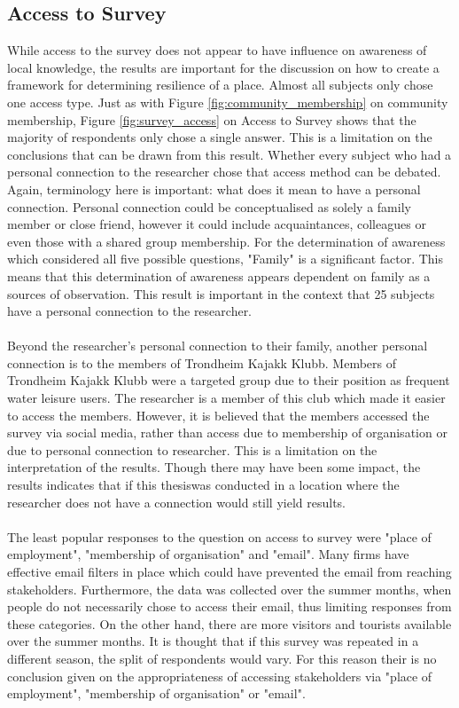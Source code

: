 \subsection{Access to Survey}
While access to the survey does not appear to have influence on awareness of local knowledge, the results are important for the discussion on how to create a framework for determining resilience of a place. Almost all subjects only chose one access type. Just as with Figure \ref{fig:community_membership} on community membership, Figure \ref{fig:survey_access} on Access to Survey shows that the majority of respondents only chose a single answer. This is a limitation on the conclusions that can be drawn from this result. Whether every subject who had a personal connection to the researcher chose that access method can be debated. Again, terminology here is important: what does it mean to have a personal connection. Personal connection could be conceptualised as solely a family member or close friend, however it could include acquaintances, colleagues or even those with a shared group membership. For the determination of awareness which considered all five possible questions, "Family" is a significant factor. This means that this determination of awareness appears dependent on family as a sources of observation. This result is important in the context that 25 subjects have a personal connection to the researcher.
\paragraph{}
Beyond the researcher's personal connection to their family, another personal connection is to the members of Trondheim Kajakk Klubb. Members of Trondheim Kajakk Klubb were a targeted group due to their position as frequent water leisure users. The researcher is a member of this club which made it easier to access the members. However, it is believed that the members accessed the survey via social media, rather than access due to  membership of organisation or due to personal connection to researcher. This is a limitation on the interpretation of the results. Though there may have been some impact, the results indicates that if this thesiswas conducted in a location where the researcher does not have a connection would still yield results.
\paragraph{}
The least popular responses to the question on access to survey were "place of employment", "membership of organisation" and "email". Many firms have effective email filters in place which could have prevented the email from reaching stakeholders. Furthermore, the data was collected over the summer months, when people do not necessarily chose to access their email, thus limiting responses from these categories. On the other hand, there are more visitors and tourists available over the summer months. It is thought that if this survey was repeated in a different season, the split of respondents would vary. For this reason their is no conclusion given on the appropriateness of accessing stakeholders via "place of employment", "membership of organisation" or "email".
